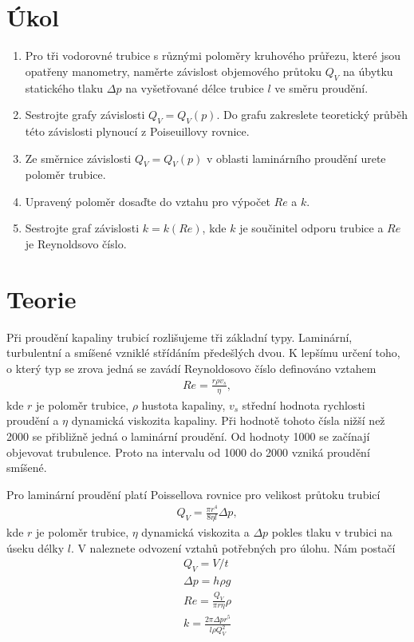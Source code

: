 \documentclass[a4paper,12pt]{article}
\begin{document}
\section{Úkol}
\begin{enumerate}
	\item Pro tři vodorovné trubice s různými poloměry kruhového průřezu, které jsou opatřeny manometry, 
	naměrte závislost objemového průtoku $Q_V$ na úbytku statického tlaku $\Delta p$ na vyšetřované délce trubice $l$ ve směru proudění.
	\item Sestrojte grafy závislosti $Q_V = Q_V(p)$. Do grafu zakreslete teoretický průběh této závislosti plynoucí z Poiseuillovy rovnice.
	\item Ze směrnice závislosti $Q_V = Q_V(p)$ v oblasti laminárního proudění urete poloměr trubice.
	\item Upravený poloměr dosaďte do vztahu pro výpočet $Re$ a $k$.
	\item Sestrojte graf závislosti $k=k(Re)$, kde $k$ je součinitel odporu trubice a $Re$ je Reynoldsovo číslo.
\end{enumerate}


\section{Teorie}
\noindent
Při proudění kapaliny trubicí rozlišujeme tři základní typy. Laminární, turbulentní a smíšené vzniklé střídáním předešlých dvou. 
K lepšímu určení toho, o který typ se zrova jedná se zavádí Reynoldosovo číslo definováno vztahem
\begin{eqnarray}
	Re=\frac{r \rho v_s}{\eta},
	\label{Re}
\end{eqnarray}
kde $r$ je poloměr trubice, $\rho$ hustota kapaliny, $v_s$ střední hodnota rychlosti proudění a $\eta$ dynamická viskozita kapaliny.
Při hodnotě tohoto čísla nižší než 2000 se přibližně jedná o laminární proudění. Od hodnoty 1000 se začínají objevovat trubulence.
Proto na intervalu od 1000 do 2000 vzniká proudění smíšené.

Pro laminární proudění platí Poissellova rovnice pro velikost průtoku trubicí
\begin{eqnarray}
	Q_V=\frac{\pi r^4}{8\eta l}\Delta p,
	\label{Poissell}
\end{eqnarray}
kde $r$ je poloměr trubice, $\eta$ dynamická viskozita a $\Delta p$ pokles tlaku v trubici na úseku délky $l$. V \cite{text} naleznete odvození 
vztahů potřebných pro úlohu. Nám postačí
\begin{eqnarray}
	Q_V=V/t \label{Q}\\
	\Delta p=h \rho g \label{p} \\
	Re=\frac{Q_V}{\pi r \eta}\rho \label{Re2} \\
	k=\frac{2\pi\Delta p r^5}{l\rho Q_V^2} \label{k}
\end{eqnarray}
\end{document}
